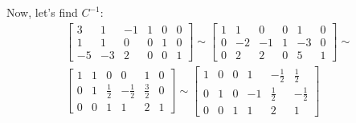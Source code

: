 \documentclass[11pt]{article}
\begin{document}
Now, let's find $C^{-1}$:
\begin{align*}
  \begin{bmatrix}
    3  & 1  & -1 & 1 & 0 & 0 \\
    1  & 1  & 0  & 0 & 1 & 0 \\
    -5 & -3 & 2  & 0 & 0 & 1
  \end{bmatrix} \sim
  \begin{bmatrix}
    1 & 1  & 0  & 0 & 1  & 0 \\
    0 & -2 & -1 & 1 & -3 & 0 \\
    0 & 2  & 2  & 0 & 5  & 1
  \end{bmatrix} \sim \\
  \begin{bmatrix}
    1 & 1 & 0           & 0            & 1           & 0 \\
    0 & 1 & \frac{1}{2} & -\frac{1}{2} & \frac{3}{2} & 0 \\
    0 & 0 & 1           & 1            & 2           & 1
  \end{bmatrix} \sim 
  \begin{bmatrix}
    1 & 0 & 0 & 1  & -\frac{1}{2} & \frac{1}{2} \\
    0 & 1 & 0 & -1 & \frac{1}{2}  & -\frac{1}{2} \\
    0 & 0 & 1 & 1  & 2            & 1
  \end{bmatrix}
\end{align*}
\end{document}
